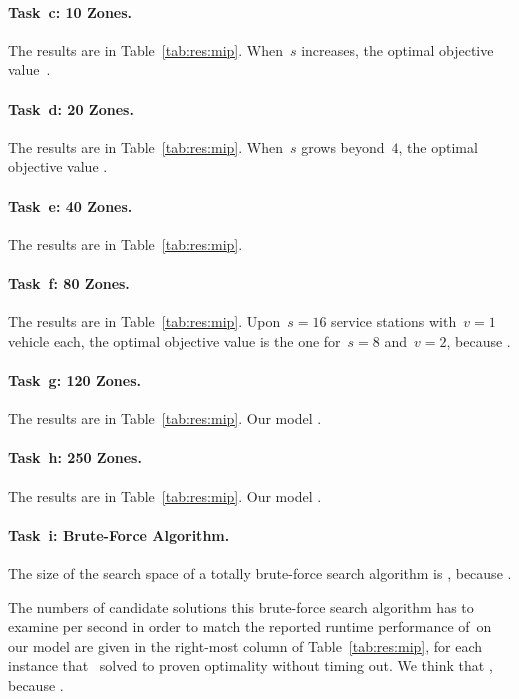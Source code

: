 \paragraph{Task~c: 10 Zones.}
The results are in Table~\ref{tab:res:mip}.
%
When~$s$ increases, the optimal objective value~\todo{\filler}.

\paragraph{Task~d: 20 Zones.}
The results are in Table~\ref{tab:res:mip}.
%
When~$s$ grows beyond~$4$, the optimal objective value \todo{\filler}.

\paragraph{Task~e: 40 Zones.}
The results are in Table~\ref{tab:res:mip}.

\paragraph{Task~f: 80 Zones.}
The results are in Table~\ref{tab:res:mip}.
%
Upon~$s=16$ service stations with~$v=1$ vehicle each, the optimal
objective value is \todo{\filler} the one for~$s=8$ and~$v=2$, because
\todo{\filler}.

\paragraph{Task~g: 120 Zones.}
The results are in Table~\ref{tab:res:mip}.
%
Our model .

\paragraph{Task~h: 250 Zones.}
The results are in Table~\ref{tab:res:mip}.
%
Our model .

\paragraph{Task~i: Brute-Force Algorithm.}
The size of the search space of a totally brute-force search algorithm
is , because \todo{\filler}.

The numbers of candidate solutions this brute-force search algorithm
has to examine per second in order to match the reported runtime
performance of~\SolverMIP on our model are given in the right-most
column of Table~\ref{tab:res:mip}, for each instance that~\SolverMIP
solved to proven optimality without timing out.
%
We think that \todo{\filler}, because \todo{\filler}.

